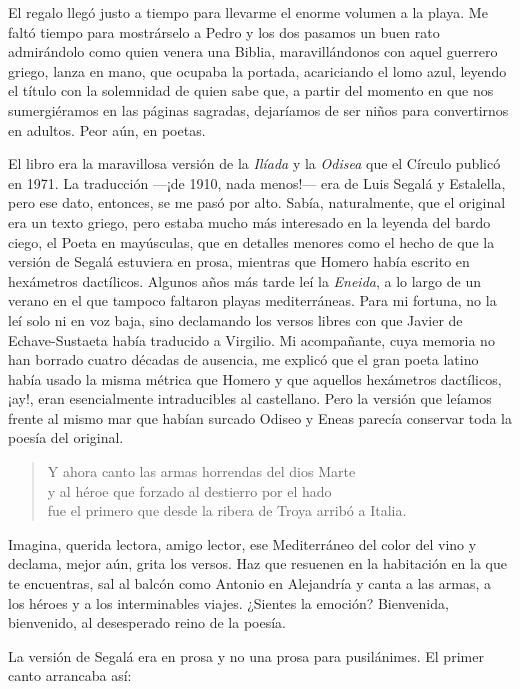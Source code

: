 El regalo llegó justo a tiempo para llevarme el enorme volumen a la playa. Me faltó tiempo para mostrárselo a Pedro y los dos pasamos un buen rato admirándolo como quien venera una Biblia, maravillándonos con aquel guerrero griego, lanza en mano, que ocupaba la portada, acariciando el lomo azul, leyendo el título con la solemnidad de quien sabe que, a partir del momento en que nos sumergiéramos en las páginas sagradas, dejaríamos de ser niños para convertirnos en adultos. Peor aún, en poetas.

El libro era la maravillosa versión de la \emph{Ilíada} y la \emph{Odisea} que el Círculo publicó en 1971. La traducción ---¡de 1910, nada menos!--- era de Luis Segalá y Estalella, pero ese dato, entonces, se me pasó por alto. Sabía, naturalmente, que el original era un texto griego, pero estaba mucho más interesado en la leyenda del bardo ciego, el Poeta en mayúsculas, que en detalles menores como el hecho de que la versión de Segalá estuviera en prosa, mientras que Homero había escrito en hexámetros dactílicos. Algunos años más tarde leí la \emph{Eneida}, a lo largo de un verano en el que tampoco faltaron playas mediterráneas. Para mi fortuna, no la leí solo ni en voz baja, sino declamando los versos libres con que Javier de Echave-Sustaeta había traducido a Virgilio. Mi acompañante, cuya memoria no han borrado cuatro décadas de ausencia, me explicó que el gran poeta latino había usado la misma métrica que Homero y que aquellos hexámetros dactílicos, ¡ay!, eran esencialmente intraducibles al castellano. Pero la versión que leíamos frente al mismo mar que habían surcado Odiseo y Eneas parecía conservar toda la poesía del original.

\begin{verse}
Y ahora canto las armas horrendas del dios Marte\\
y al héroe que forzado al destierro por el hado\\
fue el primero que desde la ribera de Troya arribó a Italia.
\end{verse}

Imagina, querida lectora, amigo lector, ese Mediterráneo del color del vino y declama, mejor aún, grita los versos. Haz que resuenen en la habitación en la que te encuentras, sal al balcón como Antonio en Alejandría y canta a las armas, a los héroes y a los interminables viajes. ¿Sientes la emoción? Bienvenida, bienvenido, al desesperado reino de la poesía.

La versión de Segalá era en prosa y no una prosa para pusilánimes. El primer canto arrancaba así:

